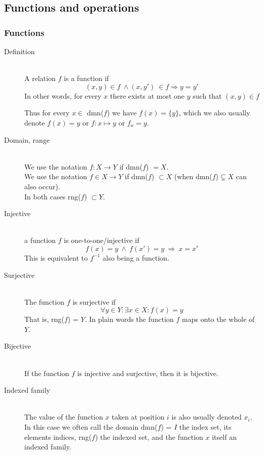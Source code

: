 \documentclass[margin=0px]{article}
\begin{document}
\subsection{Functions and operations}
\subsubsection{Functions}
\begin{description}
    \item[Definition] \hfill \\
        A relation $f$ is a function if
        \[ (x,y) \in f \ \land (x,y') \ \in f \Longrightarrow y = y' \]
        In other words, for every $x$ there exists at most one $y$ such that $(x,y) \in f$

        Thus for every $x \in$ dmn($f$) we have $f(x) = \{y\}$, which we also usually denote $f(x) = y$ or $f: x \mapsto y$ or $f_x = y$.

    \item[Domain, range] \hfill \\
        We use the notation $f : X \rightarrow Y$ if dmn($f$) $ = X $. \\
        We use the notation $f \in X \rightarrow Y$ if dmn($f$) $\subset X$ (when dmn($f$)$ \subsetneq X$ can also occur).\\
        In both cases rng($f$) $\subset Y$.

    \item[Injective] \hfill \\
        a function $f$ is one-to-one/injective if
        \[ f(x) = y \ \land \ f(x') = y \ \Longrightarrow \ x = x' \]
        This is equivalent to $f^{-1}$ also being a function.
    \item[Surjective] \hfill \\
        The function $f$ is surjective if
        \[ \forall y \in Y : \exists x\in X : f(x) = y\]
        That is, rng($f$) = $Y$. In plain words the function $f$ maps onto the whole of $Y$.
    \item[Bijective] \hfill \\
        If the function $f$ is injective and surjective, then it is bijective.
    \item[Indexed family] \hfill \\
        The value of the function $x$ taken at position $i$ is also usually denoted $x_i$. In this case we often call the domain dmn($f$) = $I$ the index set, its elements indices, rng($f$) the indexed set, and the function $x$ itself an indexed family.
\end{description}
\end{document}
